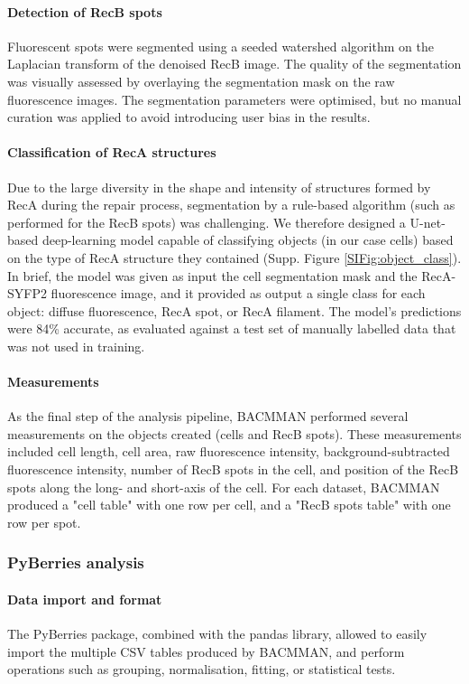 \paragraph*{Detection of RecB spots}
Fluorescent spots were segmented using a seeded watershed algorithm on the Laplacian transform of the denoised RecB image. The quality of the segmentation was visually assessed by overlaying the segmentation mask on the raw fluorescence images. The segmentation parameters were optimised, but no manual curation was applied to avoid introducing user bias in the results.

\paragraph*{Classification of RecA structures}
Due to the large diversity in the shape and intensity of structures formed by RecA during the repair process, segmentation by a rule-based algorithm (such as performed for the RecB spots) was challenging. We therefore designed a U-net-based deep-learning model capable of classifying objects (in our case cells) based on the type of RecA structure they contained (Supp. Figure \ref{SIFig:object_class}). In brief, the model was given as input the cell segmentation mask and the RecA-SYFP2 fluorescence image, and it provided as output a single class for each object: diffuse fluorescence, RecA spot, or RecA filament. The model's predictions were 84\% accurate, as evaluated against a test set of manually labelled data that was not used in training.

\paragraph*{Measurements}
As the final step of the analysis pipeline, BACMMAN performed several measurements on the objects created (cells and RecB spots). These measurements included cell length, cell area, raw fluorescence intensity, background-subtracted fluorescence intensity, number of RecB spots in the cell, and position of the RecB spots along the long- and short-axis of the cell. For each dataset, BACMMAN produced a "cell table" with one row per cell, and a "RecB spots table" with one row per spot.

\subsubsection*{PyBerries analysis}
\paragraph*{Data import and format}
The PyBerries package, combined with the pandas library, allowed to easily import the multiple CSV tables produced by BACMMAN, and perform operations such as grouping, normalisation, fitting, or statistical tests.

